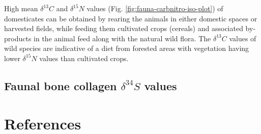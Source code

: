 \documentclass[5p]{elsarticle} %
\begin{document}
High mean \(\delta ^{13}C\) and \(\delta ^{15}N\) values (Fig. \ref{fig:fauna-carbnitro-iso-plot}) of domesticates can be obtained by rearing the animals in either domestic spaces or harvested fields, while feeding them cultivated crops (cereals) and associated by-products in the animal feed along with the natural wild flora. The \(\delta ^{13}C\) values of wild species are indicative of a diet from forested areas with vegetation having lower \(\delta ^{15}N\) values than cultivated crops.

\hypertarget{sulphur}{%
\subsection{\texorpdfstring{Faunal bone collagen \(\delta ^{34}S\) values}{Faunal bone collagen \textbackslash delta \^{}\{34\}S values}}\label{sulphur}}

\hypertarget{references}{%
\section*{References}\label{references}}
\end{document}

